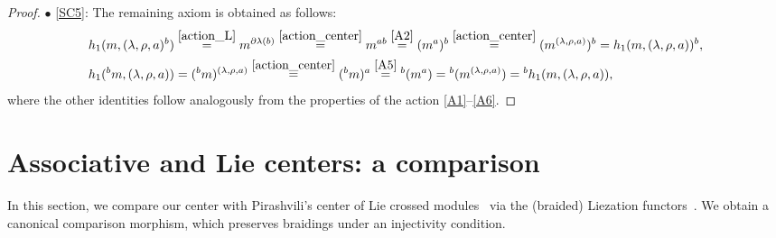 \documentclass[12pt,reqno]{amsart}
\theoremstyle{plain}
\theoremstyle{definition}
\theoremstyle{remark}
\numberwithin{equation}{section}
\begin{document}
\begin{proof}
$\bullet$ \eqref{SC5}: The remaining axiom is obtained as follows:
\begin{align*}
		h_1(m, (\lambda, \rho, a)^{b}) &\stackrel{\eqref{action_L}}{=} m^{\partial\lambda(b)}\stackrel{\eqref{action_center}} = m^{ab}\stackrel{\eqref{A2}}{=} (m^{a})^{b}\stackrel{\eqref{action_center}} = (m^{(\lambda, \rho, a)})^{b} = h_1(m, (\lambda, \rho, a))^{b}, \\
	h_1({}^{b}m, (\lambda, \rho, a)) &= ({}^{b}m)^{(\lambda, \rho, a)} \stackrel{\eqref{action_center}}{=}({}^{b}m)^{a}\stackrel{\eqref{A5}}{=}{}^{b}(m^{a})= {}^{b}(m^{(\lambda, \rho, a)}) = {}^{b}h_1(m, (\lambda, \rho, a)),
\end{align*}
where the other identities follow analogously from the properties of the action \eqref{A1}--\eqref{A6}.
\end{proof}


\section{Associative and Lie centers: a comparison}\label{S:comp}

In this section, we compare our center with Pirashvili's center of Lie
crossed modules~\cite{Pim2} via the (braided) Liezation functors~\cite{FFL1}. We obtain a canonical
comparison morphism, which preserves braidings under an injectivity condition.
\end{document}
